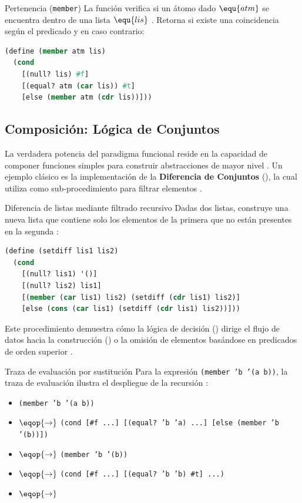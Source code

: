 \begin{definicion}{Pertenencia (\texttt{member})}
La función  verifica si un átomo dado $\equ{atm}$ se encuentra dentro de una lista $\equ{lis}$ \cite{SICP}. Retorna  si existe una coincidencia según el predicado  y  en caso contrario:
\begin{lstlisting}[language=Lisp]
(define (member atm lis)
  (cond
    [(null? lis) #f]
    [(equal? atm (car lis)) #t]
    [else (member atm (cdr lis))]))
\end{lstlisting}
\end{definicion}

\subsection*{Composición: Lógica de Conjuntos}

La verdadera potencia del paradigma funcional reside en la capacidad de componer funciones simples para construir abstracciones de mayor nivel \cite{SICP, HtDP}. Un ejemplo clásico es la implementación de la \textbf{Diferencia de Conjuntos} (), la cual utiliza  como sub-procedimiento para filtrar elementos \cite{HtDP}.

\begin{ejemplo}{Diferencia de listas mediante filtrado recursivo}
Dadas dos listas,  construye una nueva lista que contiene solo los elementos de la primera que no están presentes en la segunda \cite{HtDP}:
\begin{lstlisting}[language=Lisp, caption={Implementación de setdiff en Scheme}]
(define (setdiff lis1 lis2)
  (cond
    [(null? lis1) '()]
    [(null? lis2) lis1]
    [(member (car lis1) lis2) (setdiff (cdr lis1) lis2)]
    [else (cons (car lis1) (setdiff (cdr lis1) lis2))]))
\end{lstlisting}
Este procedimiento demuestra cómo la lógica de decisión () dirige el flujo de datos hacia la construcción () o la omisión de elementos basándose en predicados de orden superior \cite{SICP}.
\end{ejemplo}

\begin{ejemplo}{Traza de evaluación por sustitución}
Para la expresión \texttt{(member 'b '(a b))}, la traza de evaluación ilustra el despliegue de la recursión \cite{SICP}:
\begin{itemize}
    \item \texttt{(member 'b '(a b))}
    \item $\eqop{\rightarrow}$ \texttt{(cond [\#f ...] [(equal? 'b 'a) ...] [else (member 'b '(b))])}
    \item $\eqop{\rightarrow}$ \texttt{(member 'b '(b))}
    \item $\eqop{\rightarrow}$ \texttt{(cond [\#f ...] [(equal? 'b 'b) \#t] ...)}
    \item $\eqop{\rightarrow}$ 
\end{itemize}
\end{ejemplo}


